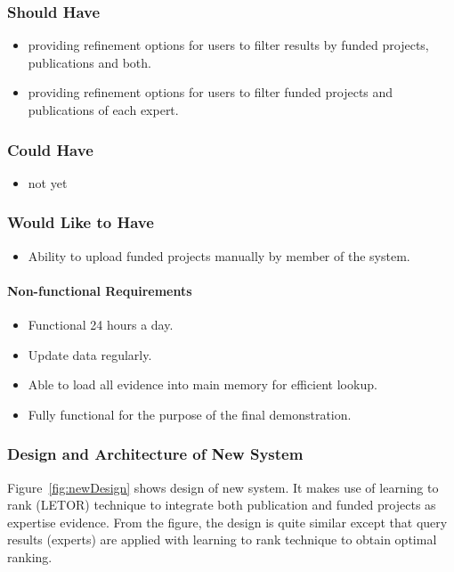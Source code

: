 \subsubsection{Should Have}
\begin{itemize}
 \item providing refinement options for users to filter results by funded projects, publications and both.
 \item providing refinement options for users to filter funded projects and publications of each expert.
\end{itemize}

\subsubsection{Could Have}
\begin{itemize}
 \item not yet
\end{itemize}

\subsubsection{Would Like to Have}
\begin{itemize}
 \item Ability to upload funded projects manually by member of the system.
\end{itemize}

\paragraph{Non-functional Requirements}
\begin{itemize}
 \item Functional 24 hours a day.
 \item Update data regularly.
 \item Able to load all evidence into main memory for efficient lookup.
 \item Fully functional for the purpose of the final demonstration.
\end{itemize}

\subsubsection{Design and Architecture of New System} \label{section:union}
Figure~\ref{fig:newDesign} shows design of new system. It makes use of learning to rank (LETOR) technique to integrate 
both publication and funded projects as expertise evidence. From the figure, the design is quite similar except that query results (experts) are
applied with learning to rank technique to obtain optimal ranking.

